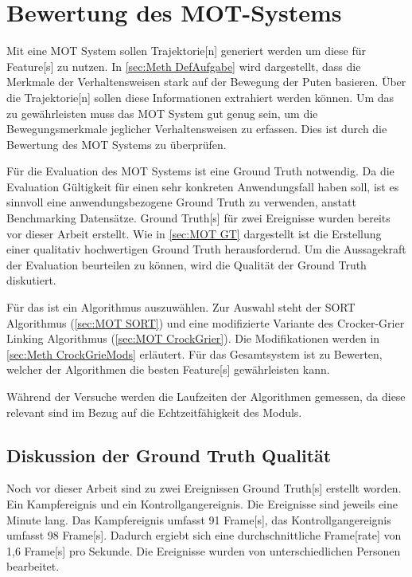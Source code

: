 \section{Bewertung des MOT-Systems} \label{sec:Meth MOT}
Mit eine \gls{MOT} System sollen \gls{Trajektorie}[n] generiert werden um diese für \gls{Feature}[s] zu nutzen. In \ref{sec:Meth DefAufgabe} wird dargestellt, dass die Merkmale der Verhaltensweisen stark auf der Bewegung der Puten basieren. Über die \gls{Trajektorie}[n] sollen diese Informationen extrahiert werden können. Um das zu gewährleisten muss das \gls{MOT} System gut genug sein, um die Bewegungsmerkmale jeglicher Verhaltensweisen zu erfassen. Dies ist durch die Bewertung des \gls{MOT} Systems zu überprüfen. \par

Für die Evaluation des \gls{MOT} Systems ist eine \gls{Ground Truth} notwendig. Da die Evaluation Gültigkeit für einen sehr konkreten Anwendungsfall haben soll, ist es sinnvoll eine anwendungsbezogene \gls{Ground Truth} zu verwenden, anstatt Benchmarking Datensätze. \gls{Ground Truth}[s] für zwei Ereignisse wurden bereits vor dieser Arbeit erstellt. Wie in \ref{sec:MOT GT} dargestellt ist die Erstellung einer qualitativ hochwertigen \gls{Ground Truth} herausfordernd. Um die Aussagekraft der Evaluation beurteilen zu können, wird die Qualität der \gls{Ground Truth} diskutiert. \par

Für das  ist ein Algorithmus auszuwählen. Zur Auswahl steht der \acrshort{SORT} Algorithmus (\autoref{sec:MOT SORT}) und eine modifizierte Variante des Crocker-Grier Linking Algorithmus (\autoref{sec:MOT CrockGrier}). Die Modifikationen werden in \autoref{sec:Meth CrockGrieMods} erläutert. Für das Gesamtsystem ist zu Bewerten, welcher der Algorithmen die besten \gls{Feature}[s] gewährleisten kann. \par

Während der Versuche werden die Laufzeiten der Algorithmen gemessen, da diese relevant sind im Bezug auf die Echtzeitfähigkeit des Moduls. 


\subsection{Diskussion der Ground Truth Qualität} \label{sec:Meth GT Quali}
Noch vor dieser Arbeit sind zu zwei Ereignissen \gls{Ground Truth}[s] erstellt worden. Ein Kampfereignis und ein Kontrollgangereignis. Die Ereignisse sind jeweils eine Minute lang. Das Kampfereignis umfasst 91 \gls{Frame}[s], das Kontrollgangereignis umfasst 98 \gls{Frame}[s]. Dadurch ergiebt sich eine durchschnittliche \gls{Frame}[rate] von 1,6 \gls{Frame}[s] pro Sekunde. Die Ereignisse wurden von unterschiedlichen Personen bearbeitet.  \par

